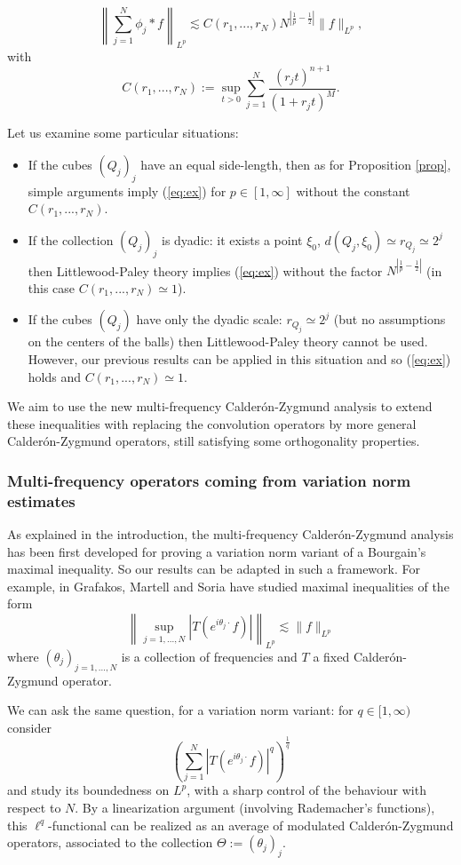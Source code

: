 \documentclass[11pt]{amsart}
\theoremstyle{remark}
\begin{document}
\begin{equation} \left\| \sum_{j=1}^N \phi_j \ast f \right\|_{L^p} \lesssim C(r_1,...,r_N) N^{\left|\frac{1}{p}-\frac{1}{2}\right|} \|f\|_{L^p}, \label{eq:ex} \end{equation}
with 
$$ C(r_1,...,r_N):= \sup_{t>0} \sum_{j=1}^N \frac{(r_j t)^{n+1}}{(1+r_jt)^{M}}.$$

Let us examine some particular situations:
\begin{itemize} 
 \item If the cubes $(Q_j)_j$ have an equal side-length, then as for Proposition \ref{prop}, simple arguments imply (\ref{eq:ex}) for $p\in[1,\infty]$ without the constant $C(r_1,...,r_N)$. 
 \item If the collection $(Q_j)_j$ is dyadic: it exists a point $\xi_0$, $d(Q_j,\xi_0) \simeq r_{Q_j} \simeq 2^j$ then Littlewood-Paley theory implies (\ref{eq:ex}) without the factor $N^{|\frac{1}{p}-\frac{1}{2}|}$ (in this case $C(r_1,...,r_N)\simeq 1$).
 \item If the cubes $(Q_j)$ have only the dyadic scale: $r_{Q_j} \simeq 2^j$ (but no assumptions on the centers of the balls) then Littlewood-Paley theory cannot be used. However, our previous results can be applied in this situation and so (\ref{eq:ex}) holds and $C(r_1,...,r_N) \simeq 1$.
\end{itemize}

We aim to use the new multi-frequency Calder\'on-Zygmund analysis to extend these inequalities with replacing the convolution operators by more general Calder\'on-Zygmund operators, still satisfying some orthogonality properties. 


\subsubsection*{Multi-frequency operators coming from variation norm estimates}

As explained in the introduction, the multi-frequency Calder\'on-Zygmund analysis has been first developed for proving a variation norm variant of a Bourgain's maximal inequality.
So our results can be adapted in such a framework. For example, in \cite{GMS} Grafakos, Martell and Soria have studied maximal inequalities of the form
$$ \left\| \sup_{j=1,...,N} \left| T( e^{i\theta_j\cdot} f) \right| \right\|_{L^p} \lesssim \|f\|_{L^p}$$
where $(\theta_j)_{j=1,...,N}$ is a collection of frequencies and $T$ a fixed Calder\'on-Zygmund operator.

We can ask the same question, for a variation norm variant: for $q\in[1,\infty)$ consider
 $$ \left(\sum_{j=1}^N \left|  T( e^{i\theta_j\cdot} f) \right|^q \right)^{\frac{1}{q}}$$
and study its boundedness on $L^p$, with a sharp control of the behaviour with respect to $N$. By a linearization argument (involving Rademacher's functions), this $\ell^q$-functional can be realized as an average of modulated Calder\'on-Zygmund operators, associated to the collection $\Theta:=(\theta_j)_j$.
\end{document}
